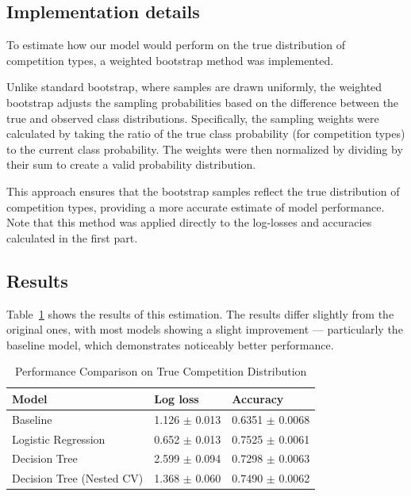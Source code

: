\documentclass[9pt]{IEEEtran}
\begin{document}
\subsection{Implementation details}

To estimate how our model would perform on the true distribution of
 competition types, a weighted bootstrap method was implemented.

Unlike standard bootstrap, where samples are drawn uniformly, the 
weighted bootstrap adjusts the sampling probabilities based on the 
difference between the true and observed class distributions.
Specifically, the sampling weights were calculated by taking the 
ratio of the true class probability (for competition types) to the 
current class probability. The weights were then normalized by dividing 
by their sum to create a valid probability distribution.

This approach ensures that the bootstrap samples reflect the true 
distribution of competition types, providing a more accurate estimate 
of model performance. Note that this method was applied directly to the 
log-losses and accuracies calculated in the first part.

\subsection{Results}
Table~\ref{tab:results_true} shows the results of this 
estimation. The results differ slightly from the original ones, with 
most models showing a slight improvement — particularly the baseline 
model, which demonstrates noticeably better performance.

\begin{table}[h]
    \begin{tabular}{l|l|l}
    Model                           & Log loss& Accuracy          \\
    \hline
    Baseline       & 1.126 $\pm$ 0.013    &  0.6351 $\pm$  0.0068          \\
    Logistic Regression       &  0.652 $\pm$ 0.013 & 0.7525 $\pm$ 0.0061               \\
    Decision Tree  &  2.599 $\pm$ 0.094  & 0.7298 $\pm$ 0.0063                \\
    Decision Tree (Nested CV)  & 1.368 $\pm$ 0.060 &  0.7490 $\pm$ 0.0062  
    \end{tabular}
    \vspace{2px}
    \caption{Performance Comparison on True Competition Distribution}
    \label{tab:results_true}
\end{table}
\end{document}
